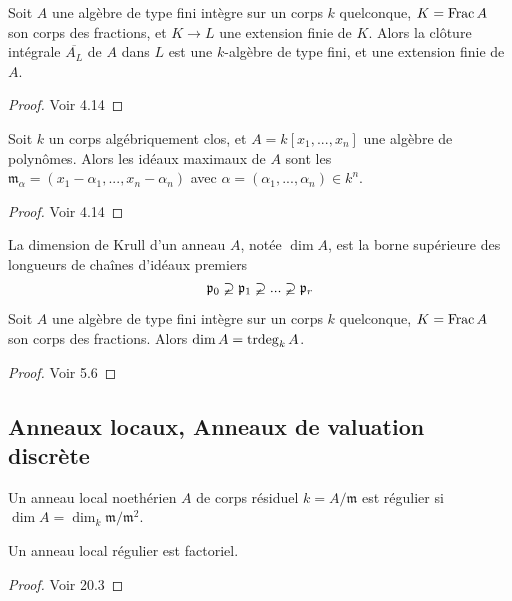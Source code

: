 \begin{thm}\label{IntClosureFinite}
Soit $A$ une algèbre de type fini intègre sur un corps $k$ quelconque, $K=\operatorname{Frac} A$ son corps des fractions, et $K\rightarrow L$ une extension finie de $K$. Alors la clôture intégrale $\overline{A_L}$ de $A$ dans $L$ est une $k$-algèbre de type fini, et une extension finie de $A$.
\end{thm}
\begin{proof}
Voir \cite{Eisenbud} 4.14
\end{proof}

\begin{thm}[Nullstellensatz]\label{Nullstellensatz}
Soit $k$ un corps algébriquement clos, et $A=k[x_1,...,x_n]$ une algèbre de polynômes. Alors les idéaux maximaux de $A$ sont les $\mathfrak{m}_\alpha=(x_1-\alpha_1,...,x_n-\alpha_n)$ avec $\alpha=(\alpha_1,...,\alpha_n)\in k^n$.
\end{thm}
\begin{proof}
Voir \cite{Eisenbud} 4.14
\end{proof}

\begin{defn}
La dimension de Krull d'un anneau $A$, notée $\dim A$, est la borne supérieure des longueurs de chaînes d'idéaux premiers
$$\mathfrak{p}_0\varsupsetneq \mathfrak{p}_1 \varsupsetneq...\varsupsetneq  \mathfrak{p}_r$$
\end{defn}

\begin{thm}\label{FundamentalDimTheory}
Soit $A$ une algèbre de type fini intègre sur un corps $k$ quelconque, $K=\operatorname{Frac} A$ son corps des fractions. Alors $\dim A=\operatorname{trdeg}_k A$.
\end{thm}
\begin{proof}
Voir \cite{Matsumura} 5.6
\end{proof}

\subsection{Anneaux locaux, Anneaux de valuation discrète}

\begin{defn}
Un anneau local noethérien $A$ de corps résiduel $k=A/\mathfrak{m}$ est régulier si $\dim A =\dim_k\mathfrak{m}/\mathfrak{m}^2$.
\end{defn}

\begin{thm}\label{reglocufd}
Un anneau local régulier est factoriel.
\end{thm}
\begin{proof}
Voir \cite{Matsumura} 20.3
\end{proof}

